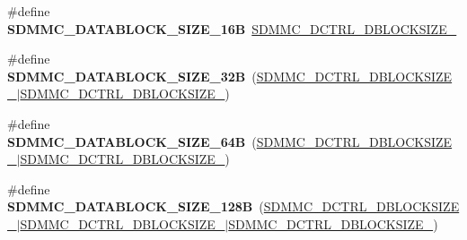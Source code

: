 \begin{DoxyCompactItemize}
\item 
\mbox{\label{group___s_d_m_m_c___l_l___data___block___size_gae9014a8fe35ab3bc3cd607b54d865f00}} 
\#define {\bfseries S\+D\+M\+M\+C\+\_\+\+D\+A\+T\+A\+B\+L\+O\+C\+K\+\_\+\+S\+I\+Z\+E\+\_\+16B}~\mbox{\hyperlink{group___peripheral___registers___bits___definition_ga4bd54ea3ef213738e740a02667bc2d1f}{S\+D\+M\+M\+C\+\_\+\+D\+C\+T\+R\+L\+\_\+\+D\+B\+L\+O\+C\+K\+S\+I\+Z\+E\+\_}}
\item 
\mbox{\label{group___s_d_m_m_c___l_l___data___block___size_gae18cff53f2536da1987fc20275b162bb}} 
\#define {\bfseries S\+D\+M\+M\+C\+\_\+\+D\+A\+T\+A\+B\+L\+O\+C\+K\+\_\+\+S\+I\+Z\+E\+\_\+32B}~(\mbox{\hyperlink{group___peripheral___registers___bits___definition_gafacd555221e3b669839f2bdc24531c06}{S\+D\+M\+M\+C\+\_\+\+D\+C\+T\+R\+L\+\_\+\+D\+B\+L\+O\+C\+K\+S\+I\+Z\+E\+\_}}$\vert$\mbox{\hyperlink{group___peripheral___registers___bits___definition_ga4bd54ea3ef213738e740a02667bc2d1f}{S\+D\+M\+M\+C\+\_\+\+D\+C\+T\+R\+L\+\_\+\+D\+B\+L\+O\+C\+K\+S\+I\+Z\+E\+\_}})
\item 
\mbox{\label{group___s_d_m_m_c___l_l___data___block___size_ga56eec0f3ea241aa662df56ec4f91cff7}} 
\#define {\bfseries S\+D\+M\+M\+C\+\_\+\+D\+A\+T\+A\+B\+L\+O\+C\+K\+\_\+\+S\+I\+Z\+E\+\_\+64B}~(\mbox{\hyperlink{group___peripheral___registers___bits___definition_gaed289ccb613a89c9fbada5cd541b88c4}{S\+D\+M\+M\+C\+\_\+\+D\+C\+T\+R\+L\+\_\+\+D\+B\+L\+O\+C\+K\+S\+I\+Z\+E\+\_}}$\vert$\mbox{\hyperlink{group___peripheral___registers___bits___definition_ga4bd54ea3ef213738e740a02667bc2d1f}{S\+D\+M\+M\+C\+\_\+\+D\+C\+T\+R\+L\+\_\+\+D\+B\+L\+O\+C\+K\+S\+I\+Z\+E\+\_}})
\item 
\mbox{\label{group___s_d_m_m_c___l_l___data___block___size_ga2e19baa01308cd9b1e942243a4a9b97d}} 
\#define {\bfseries S\+D\+M\+M\+C\+\_\+\+D\+A\+T\+A\+B\+L\+O\+C\+K\+\_\+\+S\+I\+Z\+E\+\_\+128B}~(\mbox{\hyperlink{group___peripheral___registers___bits___definition_gafacd555221e3b669839f2bdc24531c06}{S\+D\+M\+M\+C\+\_\+\+D\+C\+T\+R\+L\+\_\+\+D\+B\+L\+O\+C\+K\+S\+I\+Z\+E\+\_}}$\vert$\mbox{\hyperlink{group___peripheral___registers___bits___definition_gaed289ccb613a89c9fbada5cd541b88c4}{S\+D\+M\+M\+C\+\_\+\+D\+C\+T\+R\+L\+\_\+\+D\+B\+L\+O\+C\+K\+S\+I\+Z\+E\+\_}}$\vert$\mbox{\hyperlink{group___peripheral___registers___bits___definition_ga4bd54ea3ef213738e740a02667bc2d1f}{S\+D\+M\+M\+C\+\_\+\+D\+C\+T\+R\+L\+\_\+\+D\+B\+L\+O\+C\+K\+S\+I\+Z\+E\+\_}})

\end{DoxyCompactItemize}
